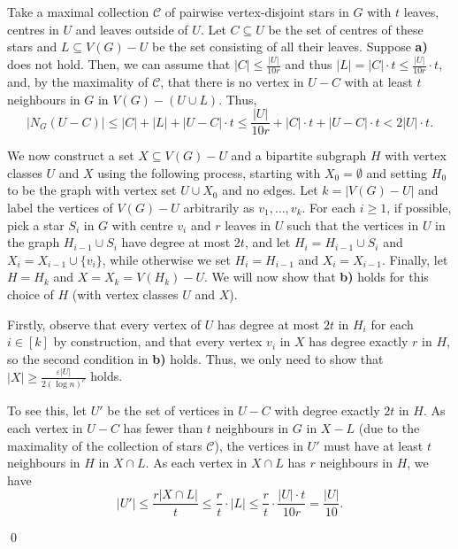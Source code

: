 \documentclass[10pt]{article}
\theoremstyle{plain}
\numberwithin{theorem}{section}
\theoremstyle{definition}
\theoremstyle{remark}
\renewenvironment{proof}[1][]{\begin{trivlist}
\item[\hspace{\labelsep}{\bf\noindent Proof#1.\/}] }{\qed\end{trivlist}}
\renewcommand{\setminus}{-}
\newcommand{\eps}{\varepsilon}
\theoremstyle{plain}
\begin{document}
	\begin{proof}
		Take a maximal collection $\mathcal C$ of pairwise vertex-disjoint stars in $G$ with $t$ leaves, centres in $U$ and leaves outside of $U$. Let $C \subseteq U$ be the set of centres of these stars and $L\subseteq V(G)\setminus U$ be the set consisting of all their leaves. Suppose \textbf{a)} does not hold. Then, we can assume that $|C| \le \frac{|U|}{10r}$ and thus $|L| = |C|\cdot t \le \frac{|U|}{10r}\cdot t$, and, by the maximality of $\mathcal C$, that there is no vertex in $U\setminus C$ with at least $t$ neighbours in $G$ in $V(G)\setminus (U\cup L)$. Thus,
		\begin{equation}\label{eqn:NGW}
			|N_{G}(U\setminus C)|\leq |C|+|L|+|U\setminus C|\cdot t\leq  \frac{|U|}{10 r}+|C|\cdot t +|U\setminus C|\cdot t< 2|U|\cdot t.
		\end{equation}

		We now construct a set $X\subseteq V(G)\setminus U$ and a bipartite subgraph $H$ with vertex classes $U$ and $X$ using the following process, starting with $X_0=\emptyset$ and setting $H_0$ to be the graph with vertex set $U\cup X_0$ and no edges. Let $k=|V(G)\setminus U|$ and label the vertices of $V(G)\setminus U$ arbitrarily as $v_1,\ldots,v_k$. For each $i\geq 1$, if possible, pick a star $S_i$ in $G$ with centre $v_i$ and $r$ leaves in $U$ such that the vertices in $U$ in the graph $H_{i-1}\cup S_i$ have degree at most $2t$, and let $H_i=H_{i-1}\cup S_i$ and $X_i=X_{i-1} \cup \{v_i\}$, while otherwise we set $H_i=H_{i-1}$ and $X_{i}=X_{i-1}$. Finally, let $H=H_k$ and $X=X_k=V(H_k)\setminus U$. We will now show that \textbf{b)} holds for this choice of $H$ (with vertex classes $U$ and $X$).


		Firstly, observe that every vertex of $U$ has degree at most $2t$ in $H_i$ for each $i\in [k]$ by construction, and that every vertex $v_i$ in $X$ has degree exactly $r$ in $H$, so the second condition in \textbf{b)} holds. Thus, we only need to show that $|X| \ge \frac{\eps|U|}{2(\log n)^c}$ holds.
  
		To see this, let $U'$ be the set of vertices in $U \setminus C$ with degree exactly $2t$ in $H$. As each vertex in $U\setminus C$ has fewer than $t$ neighbours in $G$ in $X\setminus L$ (due to the maximality of the collection of stars $\mathcal C$), the vertices in $U'$ must have at least $t$ neighbours in $H$ in $X\cap L$. As each vertex in $X\cap L$ has $r$ neighbours in $H$, we have
		\[
			|U'|\leq \frac{r|X \cap L|}{t}\le \frac{r}{t}\cdot |L| \leq \frac{r}{t}\cdot \frac{|U|\cdot t}{10r}= \frac{|U|}{10}.
		\]


\end{proof}
\end{document}
